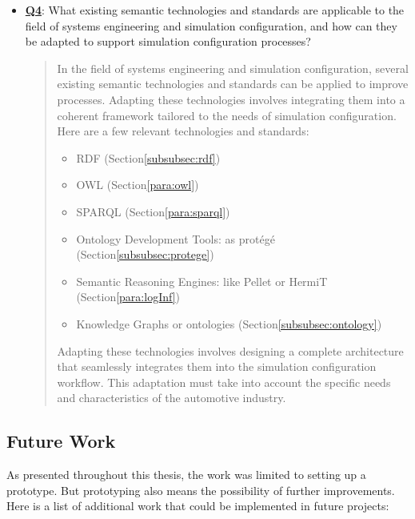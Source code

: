 \begin{itemize}
    \item \hyperref[Q4]{\textbf{Q4}}: What existing semantic technologies and standards are applicable to the field of systems engineering and simulation configuration, and how can they be adapted to support simulation configuration processes?
    \begin{quote}
        In the field of systems engineering and simulation configuration, several existing semantic technologies and standards can be applied to improve processes. Adapting these technologies involves integrating them into a coherent framework tailored to the needs of simulation configuration. Here are a few relevant technologies and standards:
         \begin{itemize}
             \item RDF (Section\ref{subsubsec:rdf})
             \item OWL (Section\ref{para:owl})
             \item SPARQL (Section\ref{para:sparql})
             \item Ontology Development Tools: as protégé (Section\ref{subsubsec:protege})
             \item Semantic Reasoning Engines: like Pellet or HermiT (Section\ref{para:logInf})
             \item Knowledge Graphs or ontologies (Section\ref{subsubsec:ontology})
         \end{itemize}
        
        Adapting these technologies involves designing a complete architecture that seamlessly integrates them into the simulation configuration workflow. This adaptation must take into account the specific needs and characteristics of the automotive industry.
    \end{quote}
\end{itemize}


 
\subsection{Future Work}
As presented throughout this thesis, the work was limited to setting up a prototype. But prototyping also means the possibility of further improvements. Here is a list of additional work that could be implemented in future projects:

